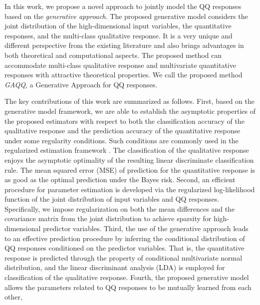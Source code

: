 \documentclass[12pt]{article}
\begin{document}
In this work, we propose a novel approach to jointly model the QQ responses based on the \emph{generative approach}. The proposed generative model considers the joint distribution of the high-dimensional input variables, the quantitative responses, and the multi-class qualitative response.
It is a very unique and different perspective from the existing literature and also brings advantages in both theoretical and computational aspects.
The proposed method can accommodate multi-class qualitative response and multivariate quantitative responses with attractive theoretical properties.
We call the proposed method \emph{GAQQ}, a Generative Approach for QQ responses.

The key contributions of this work are summarized as follows.
First, based on the generative model framework, we are able to establish the asymptotic properties of the proposed estimators with respect to both the classification accuracy of the qualitative response and the prediction accuracy of the quantitative response under some regularity conditions.
Such conditions are commonly used in the regularized estimation framework \citep{Shao2011Sparse, zhao2006on}.
The classification of the qualitative response enjoys the asymptotic optimality of the resulting linear discriminate classification rule.
The mean squared error (MSE) of prediction for the quantitative response is as good as the optimal prediction under the Bayes risk.
Second, an efficient procedure for parameter estimation is developed via the regularized log-likelihood function of the joint distribution of input variables and QQ responses.
Specifically, we impose regularization on both the mean differences and the covariance matrix from the joint distribution to achieve sparsity for high-dimensional predictor variables.
Third, the use of the generative approach leads to an effective prediction procedure by inferring the conditional distribution of QQ responses conditioned on the predictor variables.
That is, the quantitative response is predicted through the property of conditional multivariate normal distribution,
and the linear discriminant analysis (LDA) is employed for classification of the qualitative response.
Fourth, the proposed generative model allows the parameters related to QQ responses to be mutually learned from each other,
\end{document}
